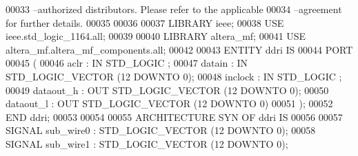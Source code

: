 \begin{DoxyCode}
{00033 \textcolor{keyword}{--authorized distributors.  Please refer to the applicable }
00034 \textcolor{keyword}{--agreement for further details.}
00035 
00036 
00037 \textcolor{vhdlkeyword}{LIBRARY }\textcolor{keywordflow}{ieee};
00038 \textcolor{vhdlkeyword}{USE }ieee.std\_logic\_1164.\textcolor{keywordflow}{all};
00039 
00040 \textcolor{vhdlkeyword}{LIBRARY }\textcolor{keywordflow}{altera\_mf};
00041 \textcolor{vhdlkeyword}{USE }altera\_mf.altera\_mf\_components.\textcolor{keywordflow}{all};
00042 
00043 \textcolor{keywordflow}{ENTITY }ddri \textcolor{keywordflow}{IS}
00044     \textcolor{keywordflow}{PORT}
00045     \textcolor{vhdlchar}{(}
00046         \textcolor{vhdlchar}{aclr}        \textcolor{vhdlchar}{:} \textcolor{keywordflow}{IN} \textcolor{comment}{STD\_LOGIC} ;
00047         \textcolor{vhdlchar}{datain}      \textcolor{vhdlchar}{:} \textcolor{keywordflow}{IN} \textcolor{comment}{STD\_LOGIC\_VECTOR} \textcolor{vhdlchar}{(}\textcolor{vhdllogic}{}\textcolor{vhdllogic}{12} \textcolor{keywordflow}{DOWNTO} \textcolor{vhdllogic}{}\textcolor{vhdllogic}{0}\textcolor{vhdlchar}{)};
00048         \textcolor{vhdlchar}{inclock}     \textcolor{vhdlchar}{:} \textcolor{keywordflow}{IN} \textcolor{comment}{STD\_LOGIC} ;
00049         \textcolor{vhdlchar}{dataout_h}       \textcolor{vhdlchar}{:} \textcolor{keywordflow}{OUT} \textcolor{comment}{STD\_LOGIC\_VECTOR} \textcolor{vhdlchar}{(}\textcolor{vhdllogic}{}\textcolor{vhdllogic}{12} \textcolor{keywordflow}{DOWNTO} \textcolor{vhdllogic}{}\textcolor{vhdllogic}{0}\textcolor{vhdlchar}{)};
00050         \textcolor{vhdlchar}{dataout_l}       \textcolor{vhdlchar}{:} \textcolor{keywordflow}{OUT} \textcolor{comment}{STD\_LOGIC\_VECTOR} \textcolor{vhdlchar}{(}\textcolor{vhdllogic}{}\textcolor{vhdllogic}{12} \textcolor{keywordflow}{DOWNTO} \textcolor{vhdllogic}{}\textcolor{vhdllogic}{0}\textcolor{vhdlchar}{)}
00051     \textcolor{vhdlchar}{)};
00052 \textcolor{keywordflow}{END} \textcolor{vhdlchar}{ddri};
00053 
00054 
00055 \textcolor{keywordflow}{ARCHITECTURE} SYN \textcolor{keywordflow}{OF} ddri IS
00056 
00057     \textcolor{keywordflow}{SIGNAL} \textcolor{vhdlchar}{sub_wire0}    \textcolor{vhdlchar}{:} \textcolor{comment}{STD\_LOGIC\_VECTOR} \textcolor{vhdlchar}{(}\textcolor{vhdllogic}{}\textcolor{vhdllogic}{12} \textcolor{keywordflow}{DOWNTO} \textcolor{vhdllogic}{}\textcolor{vhdllogic}{0}\textcolor{vhdlchar}{)};
00058     \textcolor{keywordflow}{SIGNAL} \textcolor{vhdlchar}{sub_wire1}    \textcolor{vhdlchar}{:} \textcolor{comment}{STD\_LOGIC\_VECTOR} \textcolor{vhdlchar}{(}\textcolor{vhdllogic}{}\textcolor{vhdllogic}{12} \textcolor{keywordflow}{DOWNTO} \textcolor{vhdllogic}{}\textcolor{vhdllogic}{0}\textcolor{vhdlchar}{)};
}
\end{DoxyCode}
